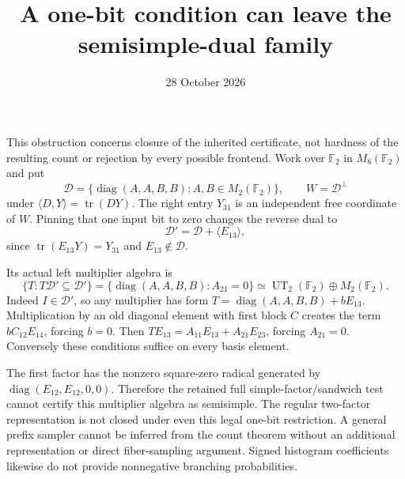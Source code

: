 \documentclass[11pt]{article}
\title{A one-bit condition can leave the semisimple-dual family}
\date{28 October 2026}
\begin{document}
\maketitle
This obstruction concerns closure of the inherited certificate, not
hardness of the resulting count or rejection by every possible frontend.
Work over $\mathbb F_2$ in $M_8(\mathbb F_2)$ and put
\[
 \mathcal D=\{\operatorname{diag}(A,A,B,B):A,B\in M_2(\mathbb F_2)\},
 \qquad W=\mathcal D^\perp
\]
under $\langle D,Y\rangle=\operatorname{tr}(DY)$.
The right entry $Y_{31}$ is an independent free coordinate of $W$.
Pinning that one input bit to zero changes the reverse dual to
\[
 \mathcal D'=\mathcal D+\langle E_{13}\rangle,
\]
since $\operatorname{tr}(E_{13}Y)=Y_{31}$ and $E_{13}\notin\mathcal D$.

Its actual left multiplier algebra is
\[
 \{T:T\mathcal D'\subseteq\mathcal D'\}
 =\{\operatorname{diag}(A,A,B,B): A_{21}=0\}
 \simeq \operatorname{UT}_2(\mathbb F_2)\oplus M_2(\mathbb F_2).
\]
Indeed $I\in\mathcal D'$, so any multiplier has form
$T=\operatorname{diag}(A,A,B,B)+bE_{13}$. Multiplication by an old
diagonal element with first block $C$ creates the term $bC_{12}E_{14}$,
forcing $b=0$. Then $TE_{13}=A_{11}E_{13}+A_{21}E_{23}$, forcing
$A_{21}=0$. Conversely these conditions suffice on every basis element.

The first factor has the nonzero square-zero radical generated by
$\operatorname{diag}(E_{12},E_{12},0,0)$. Therefore the retained full
simple-factor/sandwich test cannot certify this multiplier algebra as
semisimple. The regular two-factor representation is not closed under
even this legal one-bit restriction. A general prefix sampler cannot
be inferred from the count theorem without an additional representation
or direct fiber-sampling argument. Signed histogram coefficients likewise
do not provide nonnegative branching probabilities.
\end{document}
